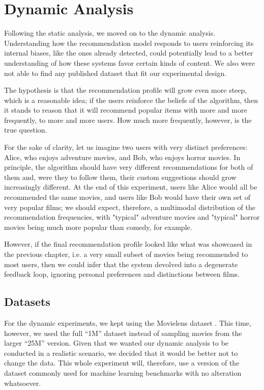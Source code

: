
\chapter{Dynamic Analysis}
\label{cap:dynamic}

Following the static analysis, we moved on to the dynamic analysis.
Understanding how the recommendation model responds to users reinforcing its
internal biases, like the ones already detected, could potentially lead to a
better understanding of how these systems favor certain kinds of content. We
also were not able to find any published dataset that fit our experimental
design.

The hypothesis is that the recommendation profile will grow even more steep,
which is a reasonable idea; if the users reinforce the beliefs of the algorithm,
then it stands to reason that it will recommend popular items with more and more
frequently, to more and more users. How much more frequently, however, is the
true question.

For the sake of clarity, let us imagine two users with very distinct
preferences: Alice, who enjoys adventure movies, and Bob, who enjoys horror
movies. In principle, the algorithm should have very different recommendations
for both of them and, were they to follow them, their custom suggestions should
grow increasingly different. At the end of this experiment, users like Alice
would all be recommended the same movies, and users like Bob would have their
own set of very popular films; we should expect, therefore, a multimodal
distribution of the recommendation frequencies, with "typical" adventure movies
and "typical" horror movies being much more popular than comedy, for example.

However, if the final recommendation profile looked like what was showcased in
the previous chapter, i.e. a very small subset of movies being recommended to
most users, then we could infer that the system devolved into a degenerate
feedback loop, ignoring personal preferences and distinctions between films.

\section{Datasets}
\label{sec:datasets04}

For the dynamic experiments, we kept using the Movielens dataset
\citep{harper_movielens_2015}. This time, however, we used the full ``1M''
dataset instead of sampling movies from the larger ``25M'' version. Given that
we wanted our dynamic analysis to be conducted in a realistic scenario, we
decided that it would be better not to change the data. This whole experiment
will, therefore, use a version of the dataset commonly used for machine learning
benchmarks with no alteration whatsoever.

